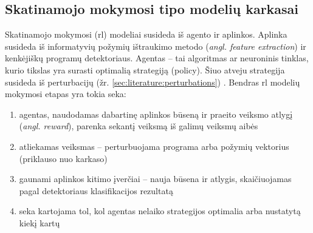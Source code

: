 \subsection{Skatinamojo mokymosi tipo modelių karkasai}\label{sec:literature:rl}

Skatinamojo mokymosi (\acs{rl}) modeliai susideda iš agento ir aplinkos. Aplinka susideda iš informatyvių požymių ištraukimo metodo (\textit{angl. feature extraction}) ir kenkėjiškų programų detektoriaus. Agentas -- tai algoritmas ar neuroninis tinklas, kurio tikslas yra surasti optimalią strategiją (\gls{policy}). Šiuo atveju strategija susideda iš perturbacijų (žr. \ref{sec:literature:perturbations}) \citeplace. Bendras \ac{rl} modelių mokymosi etapas yra tokia seka:
\begin{enumerate}
    \item agentas, naudodamas dabartinę aplinkos būseną ir praeito veiksmo atlygį (\textit{angl. reward}), parenka sekantį veiksmą iš galimų veiksmų aibės
    \item atliekamas veiksmas -- perturbuojama programa arba požymių vektorius (priklauso nuo karkaso)
    \item gaunami aplinkos kitimo įverčiai -- nauja būsena ir atlygis, skaičiuojamas pagal detektoriaus klasifikacijos rezultatą
    \item seka kartojama tol, kol agentas nelaiko strategijos optimalia arba nustatytą kiekį kartų
\end{enumerate}
\citeplace{}